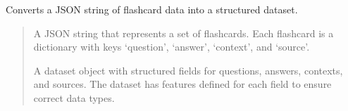 \documentclass[letterpaper,10pt,english,openany,oneside]{sphinxmanual}
\begin{document}

\begin{fulllineitems}
\label{\detokenize{utils:tools.pipeline.prepare_dataset}}
\pysigstartsignatures
{}
\pysigstopsignatures
\sphinxAtStartPar
Converts a JSON string of flashcard data into a structured dataset.
\begin{quote}\begin{description}
\sphinxAtStartPar
{} \textendash{} A JSON string that represents a set of flashcards. Each flashcard is a dictionary
with keys ‘question’, ‘answer’, ‘context’, and ‘source’.

\sphinxAtStartPar
A dataset object with structured fields for questions, answers, contexts, and sources. The dataset
has features defined for each field to ensure correct data types.

\end{description}\end{quote}

\end{fulllineitems}

\end{document}

